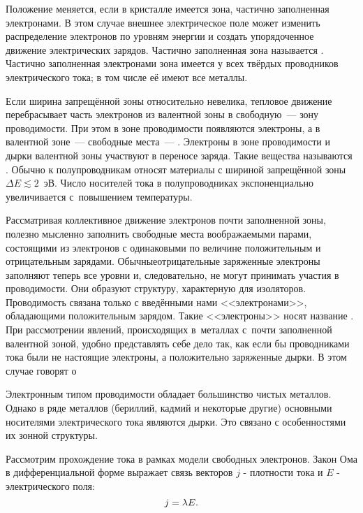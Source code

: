 Положение меняется, если в кристалле имеется зона, частично заполненная электронами. В этом случае внешнее электрическое поле может изменить распределение электронов по уровням энергии и создать упорядоченное движение электрических зарядов. Частично заполненная зона называется . Частично заполненная электронами зона имеется у всех твёрдых проводников электрического тока; в том числе её имеют все металлы.

Если ширина запрещённой зоны относительно невелика, тепловое движение перебрасывает часть электронов из валентной зоны в свободную~--- зону проводимости. При этом в зоне проводимости появляются электроны, а в валентной зоне~--- свободные места~--- . Электроны в зоне проводимости и дырки валентной зоны участвуют в переносе заряда. Такие вещества называются . Обычно к полупроводникам относят материалы с шириной запрещённой зоны $\Delta E \lesssim 2$~эВ. Число носителей тока в полупроводниках экспоненциально увеличивается с~повышением температуры.

Рассматривая коллективное движение электронов почти заполненной зоны, полезно мысленно заполнить свободные места
воображаемыми парами, состоящими из электронов с одинаковыми по величине положительным и отрицательным зарядами. Обычныеотрицательные заряженные электроны заполняют теперь все уровни и, следовательно, не могут принимать участия в проводимости. Они образуют структуру, характерную для изоляторов. Проводимость связана только с введёнными нами
<<электронами>>, обладающими положительным зарядом. Такие <<электроны>> носят название . При рассмотрении явлений, происходящих в~металлах с~почти заполненной валентной зоной, удобно представлять себе дело так, как если бы проводниками тока были не настоящие электроны, а положительно заряженные дырки. В этом случае говорят о 

Электронным типом проводимости обладает большинство чистых металлов. Однако в ряде металлов (бериллий, кадмий и
некоторые другие) основными носителями электрического тока являются дырки. Это связано с особенностями их зонной
структуры.

Рассмотрим прохождение тока в рамках модели свободных электронов.
Закон Ома в дифференциальной форме выражает связь векторов $j$ - плотности тока и $E$ - электрического поля:
\begin{equation}
	j=\lambda E.
	\eqmark{3.16}
\end{equation}

